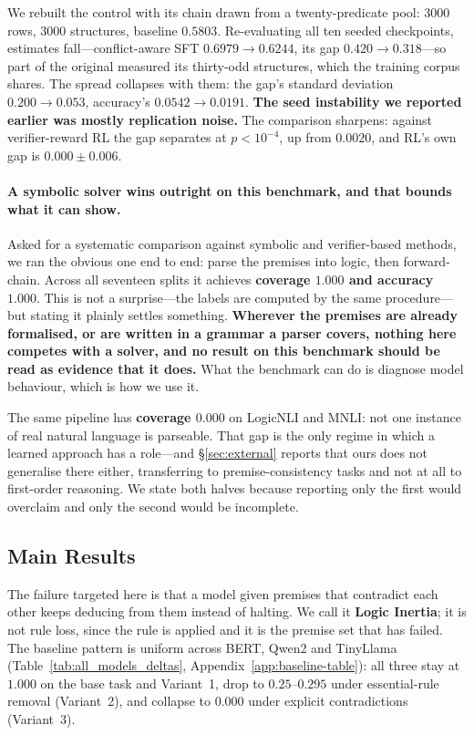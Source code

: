 \documentclass{article}
\begin{document}
We rebuilt the control with its chain drawn from a twenty-predicate pool: 3000
rows, 3000 structures, baseline $0.5803$. Re-evaluating all ten seeded
checkpoints, estimates fall---conflict-aware SFT $0.6979 \to 0.6244$, its gap
$0.420 \to 0.318$---so part of the original measured its thirty-odd structures,
which the training corpus shares. The spread collapses with them: the gap's
standard deviation $0.200 \to \mathbf{0.053}$, accuracy's $0.0542 \to 0.0191$.
\textbf{The seed instability we reported earlier was mostly replication noise.}
The comparison sharpens: against verifier-reward RL the gap separates at
$p{<}10^{-4}$, up from $0.0020$, and RL's own gap is $0.000 \pm 0.006$.

\paragraph{A symbolic solver wins outright on this benchmark, and that bounds
what it can show.} Asked for a systematic comparison against symbolic and
verifier-based methods, we ran the obvious one end to end: parse the premises
into logic, then forward-chain. Across all seventeen splits it achieves
\textbf{coverage $1.000$ and accuracy $1.000$}. This is not a surprise---the
labels are computed by the same procedure---but stating it plainly settles
something. \textbf{Wherever the premises are already formalised, or are written
in a grammar a parser covers, nothing here competes with a solver, and no result
on this benchmark should be read as evidence that it does.} What the benchmark
can do is diagnose model behaviour, which is how we use it.

The same pipeline has \textbf{coverage $0.000$} on LogicNLI and MNLI: not one
instance of real natural language is parseable. That gap is the only regime in
which a learned approach has a role---and \S\ref{sec:external} reports that ours
does not generalise there either, transferring to premise-consistency tasks and
not at all to first-order reasoning. We state both halves because reporting only
the first would overclaim and only the second would be incomplete.

\subsection{Main Results}
The failure targeted here is that a model given premises that contradict each
other keeps deducing from them instead of halting. We call it \textbf{Logic
Inertia}; it is not rule loss, since the rule is applied and it is the premise
set that has failed. The baseline pattern is uniform across BERT, Qwen2 and TinyLlama (Table~\ref{tab:all_models_deltas}, Appendix~\ref{app:baseline-table}): all three stay at $1.000$ on the base task and Variant~1, drop to $0.25$--$0.295$ under essential-rule removal (Variant~2), and collapse to $0.000$ under explicit contradictions (Variant~3).
\end{document}
